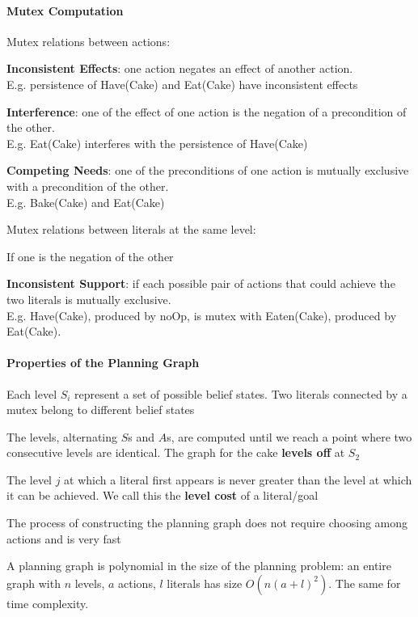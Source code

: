 \documentclass[10pt]{report}
\begin{document}
\paragraph{Mutex Computation} Mutex relations between actions:
\begin{list}{}{}
	\item \textbf{Inconsistent Effects}: one action negates an effect of another action.\\E.g. persistence of Have(Cake) and Eat(Cake) have inconsistent effects
	\item \textbf{Interference}: one of the effect of one action is the negation of a precondition of the other.\\E.g. Eat(Cake) interferes with the persistence of Have(Cake)
	\item \textbf{Competing Needs}: one of the preconditions of one action is mutually exclusive with a precondition of the other.\\E.g. Bake(Cake) and Eat(Cake)
\end{list}
Mutex relations between literals at the same level:
\begin{list}{}{}
	\item If one is the negation of the other
	\item \textbf{Inconsistent Support}: if each possible pair of actions that could achieve the two literals is mutually exclusive.\\
	E.g. Have(Cake), produced by noOp, is mutex with Eaten(Cake), produced by Eat(Cake).
\end{list}
\paragraph{Properties of the Planning Graph}
\begin{list}{}{}
	\item Each level $S_i$ represent a set of possible belief states. Two literals connected by a mutex belong to different belief states
	\item The levels, alternating $S$s and $A$s, are computed until we reach a point where two consecutive levels are identical. The graph for the cake \textbf{levels off} at $S_2$
	\item The level $j$ at which a literal first appears is never greater than the level at which it can be achieved. We call this the \textbf{level cost} of a literal/goal
	\item The process of constructing the planning graph does not require choosing among actions and is very fast
	\item A planning graph is polynomial in the size of the planning problem: an entire graph with $n$ levels, $a$ actions, $l$ literals has size $O(n(a+l)^2)$. The same for time complexity.
\end{list}
\end{document}
